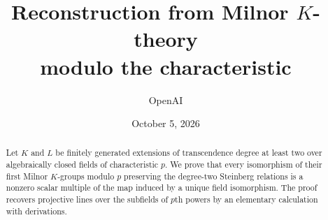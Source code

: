 \documentclass[11pt]{article}
\title{Reconstruction from Milnor $K$-theory\\modulo the characteristic}
\author{OpenAI}
\date{October 5, 2026}
\begin{document}
\maketitle
\begin{abstract}
Let $K$ and $L$ be finitely generated extensions of transcendence degree
at least two over algebraically closed fields of characteristic $p$.
We prove that every isomorphism of their first Milnor $K$-groups modulo
$p$ preserving the degree-two Steinberg relations is a nonzero scalar
multiple of the map induced by a unique field isomorphism. The proof
recovers projective lines over the subfields of $p$th powers by an
elementary calculation with derivations.
\end{abstract}






\begingroup\raggedright{}

\endgroup
\end{document}

